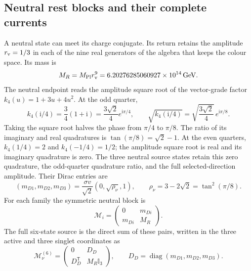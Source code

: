 \documentclass[aps,prx,onecolumn,10pt,notitlepage,nofootinbib,longbibliography]{revtex4-2}
\numberwithin{equation}{section}
\numberwithin{table}{section}
\newcommand{\Id}{\mathbb I}
\newcommand{\diag}{\operatorname{diag}}
\newcommand{\ii}{\mathrm i}
\newcommand{\GeV}{\,\mathrm{GeV}}
\newcommand{\MR}{M_R}
\newcommand{\MP}{M_{\mathrm{Pl}}}
\begin{document}
\subsection{Neutral rest blocks and their complete currents}
\label{sec:neutralreturn}

A neutral state can meet its charge conjugate. Its return retains the amplitude $r_{\rm v}=1/3$ in each of the nine real generators of the algebra that keeps the colour space. Its mass is
\begin{equation}
 \MR=\MP r_{\rm v}^9=6.20276285060927\times10^{14}\GeV.
 \label{eq:neutralthresholds}
\end{equation} The neutral endpoint reads the amplitude square root of the vector-grade factor $k_4(u)=1+3u+4u^2$. At the odd quarter,
\begin{equation}
 k_4(\ii/4)=\frac34(1+\ii)
 =\frac{3\sqrt2}{4}e^{\ii\pi/4},\qquad
 \sqrt{k_4(\ii/4)}=\sqrt{\frac{3\sqrt2}{4}}\,e^{\ii\pi/8}.
 \label{eq:neutralhalfphase}
\end{equation}
Taking the square root halves the phase from $\pi/4$ to $\pi/8$. The ratio of its imaginary and real quadratures is $\tan(\pi/8)=\sqrt2-1$. At the even quarters, $k_4(1/4)=2$ and $k_4(-1/4)=1/2$; the amplitude square root is real and its imaginary quadrature is zero. The three neutral source states retain this zero quadrature, the odd-quarter quadrature ratio, and the full selected-direction amplitude. Their Dirac entries are
\begin{equation}
 (m_{D1},m_{D2},m_{D3})=\frac{\sigma v}{\sqrt2}(0,\sqrt{\rho_\nu},1),
 \qquad \rho_\nu=3-2\sqrt2=\tan^2(\pi/8).
\end{equation}
For each family the symmetric neutral block\cite{Minkowski} is
\begin{equation}
 \mathcal M_i=\begin{pmatrix}0&m_{Di}\\m_{Di}&\MR\end{pmatrix}.
 \label{eq:neutralblock}
\end{equation}
The full six-state source is the direct sum of these pairs, written in the three active and three singlet coordinates as
\begin{equation}
 \mathcal M_\nu^{(6)}=
 \begin{pmatrix}0&D_D\\D_D^{\mathsf T}&\MR\Id_3\end{pmatrix},
 \qquad D_D=\diag(m_{D1},m_{D2},m_{D3}).
 \label{eq:neutralfull}
\end{equation}
\end{document}
